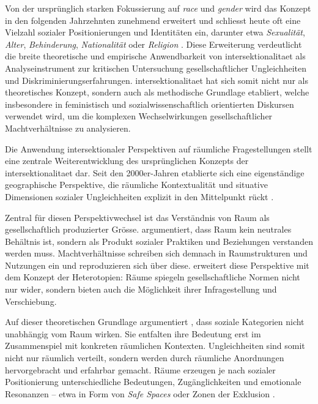 Von der ursprünglich starken Fokussierung auf \textit{race} und \textit{gender} wird das Konzept in den folgenden Jahrzehnten zunehmend erweitert und schliesst heute oft eine Vielzahl sozialer Positionierungen und Identitäten ein, darunter etwa \emph{Sexualität}, \emph{Alter}, \emph{Behinderung}, \emph{Nationalität} oder \emph{Religion} \parencite{bauerIntersectionalityQuantitativeResearch2021, bowlegInvitedReflectionQuantifying2016}. Diese Erweiterung verdeutlicht die breite theoretische und empirische Anwendbarkeit von \gls{intersektionalitaet} als Analyseinstrument zur kritischen Untersuchung gesellschaftlicher Ungleichheiten und Diskriminierungserfahrungen. \gls{intersektionalitaet} hat sich somit nicht nur als theoretisches Konzept, sondern auch als methodische Grundlage etabliert, welche insbesondere in feministisch und sozialwissenschaftlich orientierten Diskursen verwendet wird, um die komplexen Wechselwirkungen gesellschaftlicher Machtverhältnisse zu analysieren.

\vspace{2em}

Die Anwendung intersektionaler Perspektiven auf räumliche Fragestellungen stellt eine zentrale Weiterentwicklung des ursprünglichen Konzepts der \gls{intersektionalitaet} dar. Seit den 2000er-Jahren etablierte sich eine eigenständige geographische Perspektive, die räumliche Kontextualität und situative Dimensionen sozialer Ungleichheiten explizit in den Mittelpunkt rückt \parencite{valentineTheorizingResearchingIntersectionality2007,rodo-de-zarateIntersectionalityFeministGeographies2018}.

Zentral für diesen Perspektivwechsel ist das Verständnis von Raum als gesellschaftlich produzierter Grösse. \textcite{lefebvreProductionLespace1974} argumentiert, dass Raum kein neutrales Behältnis ist, sondern als Produkt sozialer Praktiken und Beziehungen verstanden werden muss. Machtverhältnisse schreiben sich demnach in Raumstrukturen und Nutzungen ein und reproduzieren sich über diese. \textcite{foucaultEspacesAutres2004} erweitert diese Perspektive mit dem Konzept der Heterotopien: Räume spiegeln gesellschaftliche Normen nicht nur wider, sondern bieten auch die Möglichkeit ihrer Infragestellung und Verschiebung.

Auf dieser theoretischen Grundlage argumentiert \textcite{valentineTheorizingResearchingIntersectionality2007}, dass soziale Kategorien nicht unabhängig vom Raum wirken. Sie entfalten ihre Bedeutung erst im Zusammenspiel mit konkreten räumlichen Kontexten. Ungleichheiten sind somit nicht nur räumlich verteilt, sondern werden durch räumliche Anordnungen hervorgebracht und erfahrbar gemacht. Räume erzeugen je nach sozialer Positionierung unterschiedliche Bedeutungen, Zugänglichkeiten und emotionale Resonanzen -- etwa in Form von \textit{Safe Spaces} oder Zonen der Exklusion \parencite[\gls{vgl}][]{rodo-de-zarateIntersectionalityFeministGeographies2018}.

